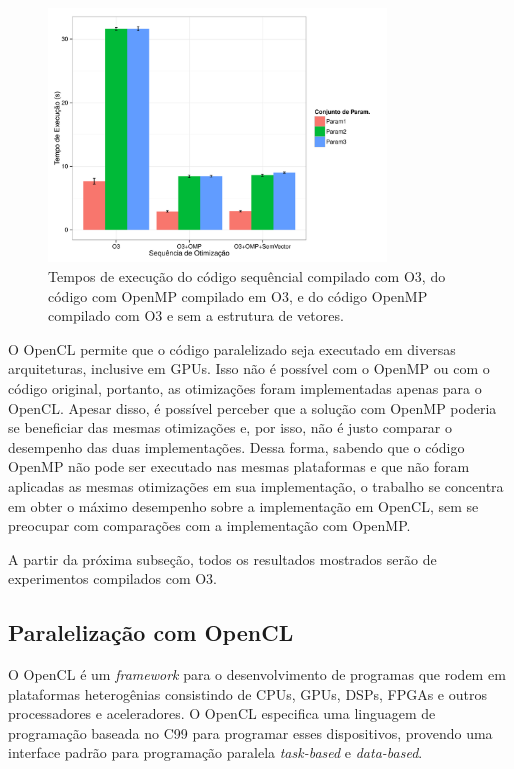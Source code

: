 \documentclass[12pt]{article}
\begin{document}
\begin{figure}[H]
\centering
\includegraphics[width=0.8\textwidth]{omp.pdf}
\caption{Tempos de execução do código sequêncial compilado com O3, do código com OpenMP compilado em O3, e do código OpenMP compilado com O3 e sem a estrutura de vetores.}
\label{fgomp}
\end{figure}

O OpenCL permite que o código paralelizado seja executado em diversas arquiteturas, inclusive em GPUs. Isso não é possível com o OpenMP ou com o código original, portanto, as otimizações foram implementadas apenas para o OpenCL. Apesar disso, é possível perceber que a solução com OpenMP poderia se beneficiar das mesmas otimizações e, por isso, não é justo comparar o desempenho das duas implementações. Dessa forma, sabendo que o código OpenMP não pode ser executado nas mesmas plataformas e que não foram aplicadas as mesmas otimizações em sua implementação, o trabalho se concentra em obter o máximo desempenho sobre a implementação em OpenCL, sem se preocupar com comparações com a implementação com OpenMP.

A partir da próxima subseção, todos os resultados mostrados serão de experimentos compilados com O3.

\subsection{Paralelização com OpenCL} \label{ocl}

O OpenCL é um \textit{framework} para o desenvolvimento de programas que rodem em plataformas heterogênias consistindo de CPUs, GPUs, DSPs, FPGAs e outros processadores e aceleradores. O OpenCL especifica uma linguagem de programação baseada no C99 para programar esses dispositivos, provendo uma interface padrão para programação paralela \textit{task-based} e \textit{data-based}.
\end{document}
